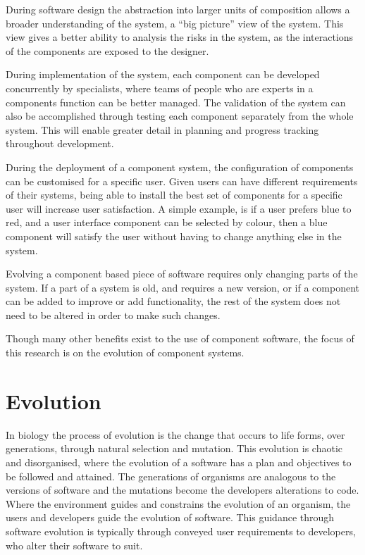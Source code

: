 During software design the abstraction into larger units of composition allows a broader understanding of the system, a ``big picture'' view of the system.
This view gives a better ability to analysis the risks in the system, as the interactions of the components are exposed to the designer.
 
During implementation of the system, each component can be developed concurrently by specialists, where teams of people who are experts in a components function can be better managed.
The validation of the system can also be accomplished through testing each component separately from the whole system.
This will enable greater detail in planning and progress tracking throughout development.

During the deployment of a component system, the configuration of components can be customised for a specific user.
Given users can have different requirements of their systems, being able to install the best set of components for a specific user will increase user satisfaction.
A simple example, is if a user prefers blue to red, and a user interface component can be selected by colour, 
then a blue component will satisfy the user without having to change anything else in the system.

Evolving a component based piece of software requires only changing parts of the system.
If a part of a system is old, and requires a new version, or if a component can be added to improve or add functionality,
the rest of the system does not need to be altered in order to make such changes.

Though many other benefits exist to the use of component software, the focus of this research is on the evolution of component systems.

\section{Evolution}
In biology the process of evolution is the change that occurs to life forms, over generations, through natural selection and mutation.
This evolution is chaotic and disorganised, where the evolution of a software has a plan and objectives to be followed and attained.
The generations of organisms are analogous to the versions of software and the mutations become the developers alterations to code.
Where the environment guides and constrains the evolution of an organism, the users and developers guide the evolution of software.
This guidance through software evolution is typically through conveyed user requirements to developers, who alter their software to suit.

